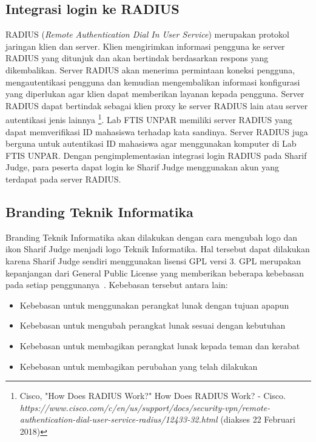 \subsection{Integrasi login ke RADIUS}
RADIUS (\textit{Remote Authentication Dial In User Service}) merupakan protokol jaringan klien dan server. Klien mengirimkan informasi pengguna ke server RADIUS yang ditunjuk dan akan bertindak berdasarkan respons yang dikembalikan. Server RADIUS akan menerima permintaan koneksi pengguna, mengautentikasi pengguna dan kemudian mengembalikan informasi konfigurasi yang diperlukan agar klien dapat memberikan layanan kepada pengguna. Server RADIUS dapat bertindak sebagai klien proxy ke server RADIUS lain atau server autentikasi jenis lainnya \footnote{Cisco, "How Does RADIUS Work?" How Does RADIUS Work? - Cisco. \textit{https://www.cisco.com/c/en/us/support/docs/security-vpn/remote-authentication-dial-user-service-radius/12433-32.html} (diakses 22 Februari 2018)}. %
Lab FTIS UNPAR memiliki server RADIUS yang dapat memverifikasi ID mahasiswa terhadap kata sandinya. Server RADIUS juga berguna untuk autentikasi ID mahasiswa agar menggunakan komputer di Lab FTIS UNPAR. Dengan pengimplementasian integrasi login RADIUS pada Sharif Judge, para peserta dapat login ke Sharif Judge menggunakan akun yang terdapat pada server RADIUS. 

\subsection{Branding Teknik Informatika}
Branding Teknik Informatika akan dilakukan dengan cara mengubah logo dan ikon Sharif Judge menjadi logo Teknik Informatika. Hal tersebut dapat dilakukan karena Sharif Judge sendiri menggunakan lisensi GPL versi 3. GPL merupakan kepanjangan dari General Public License yang memberikan beberapa kebebasan pada setiap penggunanya~\cite{brett:10:moss}. %
Kebebasan tersebut antara lain:
	\begin{itemize}
		\item Kebebasan untuk menggunakan perangkat lunak dengan tujuan apapun \\
		\item Kebebasan untuk mengubah perangkat lunak sesuai dengan kebutuhan \\
		\item Kebebasan untuk membagikan perangkat lunak kepada teman dan kerabat \\
		\item Kebebasan untuk membagikan perubahan yang telah dilakukan
	\end{itemize}

